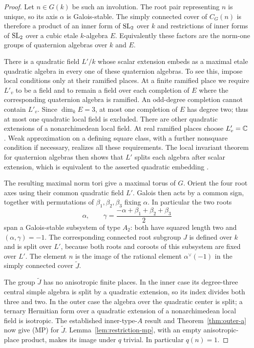 \begin{proof}
Let $n\in G(k)$ be such an involution.  The root pair representing $n$ is
unique, so its axis $\alpha$ is Galois-stable.  The simply connected cover
of $C_G(n)$ is therefore a product of an inner form of $\operatorname{SL}_2$ over $k$
and restrictions of inner forms of $\operatorname{SL}_2$ over a cubic etale $k$-algebra
$E$.  Equivalently these factors are the norm-one groups of quaternion
algebras over $k$ and $E$.

There is a quadratic field $L'/k$ whose scalar extension embeds as a
maximal etale quadratic algebra in every one of these quaternion
algebras.  To see this, impose local conditions only at their ramified
places.  At a finite ramified place we require $L'_v$ to be a field and
to remain a field over each completion of $E$ where the corresponding
quaternion algebra is ramified.  An odd-degree completion cannot contain
$L'_v$.  Since $\dim_k E=3$, at most one completion of $E$ has degree two;
thus at most one quadratic local field is excluded.  There are other
quadratic extensions of a nonarchimedean local field.  At real ramified
places choose $L'_v=\mathbb C$.  Weak approximation on a defining square class,
with a further nonsquare condition if necessary, realizes all these
requirements.  The local invariant theorem for quaternion algebras then
shows that $L'$ splits each algebra after scalar extension, which is
equivalent to the asserted quadratic embedding
\cite{PRbook,Reiner,KMRT}.

The resulting maximal norm tori give a maximal torus of $G$.  Orient the
four root axes using their common quadratic field $L'$.  Galois then acts
by a common sign, together with permutations of $\beta_1,\beta_2,\beta_3$
fixing $\alpha$.  In particular the two roots
\[
 \alpha,\qquad
 \gamma=\frac{-\alpha+\beta_1+\beta_2+\beta_3}{2}
\]
span a Galois-stable subsystem of type $A_2$: both have squared length
two and $(\alpha,\gamma)=-1$.  The corresponding connected root subgroup
$J$ is defined over $k$ and is split over $L'$, because both roots and
coroots of this subsystem are fixed over $L'$.  The element $n$ is the
image of the rational element $\alpha^\vee(-1)$ in the simply connected
cover $\widetilde J$.

The group $\widetilde J$ has no anisotropic finite places.  In the inner
case its degree-three central simple algebra is split by a quadratic
extension, so its index divides both three and two.  In the outer case
the algebra over the quadratic center is split; a ternary Hermitian form
over a quadratic extension of a nonarchimedean local field is isotropic.
The established inner-type-$A$ result and Theorem~\ref{thm:outer-a} now
give (MP) for $\widetilde J$.  Lemma~\ref{lem:restriction-mp}, with an empty
anisotropic-place product, makes its image under $q$ trivial.  In
particular $q(n)=1$.
\end{proof}

